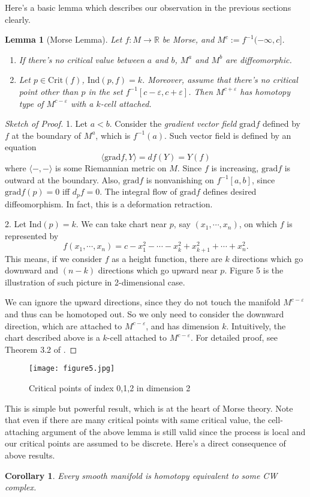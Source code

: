 \documentclass{article}
\newtheorem{lemma}[theorem]{Lemma}
\newtheorem{corollary}[theorem]{Corollary}
\newcommand{\R}{\mathbb{R}}
\newcommand{\ep}{\varepsilon}
\newcommand{\il}{\langle}
\newcommand{\ir}{\rangle}
\newcommand{\Crit}{\mathrm{Crit}}
\newcommand{\grad}{\mathrm{grad}}
\newcommand{\Ind}{\mathrm{Ind}}
\begin{document}
Here's a basic lemma which describes our observation in the previous sections clearly.
	\begin{lemma}[Morse Lemma]\rm
	Let $f:M\to\R$ be Morse, and $M^c:=f^{-1}(-\infty,c]$.
	\begin{enumerate}
	\item If there's no critical value between $a$ and $b$, $M^a$ and $M^b$ are diffeomorphic.
	\item Let $p\in\Crit(f)$, $\Ind(p,f)=k$.
	Moreover, assume that there's no critical point other than $p$ in the set $f^{-1}[c-\ep,c+\ep]$.
	Then $M^{c+\ep}$ has homotopy type of $M^{c-\ep}$ with a $k$-cell attached.
	\end{enumerate}
	\end{lemma}
		\begin{proof}[Sketch of Proof]
		1. Let $a<b$.
		Consider the \emph{gradient vector field} $\grad f$ defined by $f$ at the boundary of $M^a$, which is $f^{-1}(a)$.
		Such vector field is defined by an equation
			$$\il\grad f,Y\ir=df(Y)=Y(f)$$
		where $\il-,-\ir$ is some Riemannian metric on $M$.
		Since $f$ is increasing, $\grad f$ is outward at the boundary.
		Also, $\grad f$ is nonvanishing on $f^{-1}[a,b]$, since $\grad f(p)=0$ iff $d_p f=0$.
		The integral flow of $\grad f$ defines desired diffeomorphism.
		In fact, this is a deformation retraction.
		
		2. Let $\Ind(p)=k$.
		We can take chart near $p$, say $(x_1,\cdots,x_n)$, on which $f$ is represented by
			$$f(x_1,\cdots,x_n)=c-x_1^2-\cdots-x_k^2+x_{k+1}^2+\cdots+x_n^2.$$
		This means, if we consider $f$ as a height function, there are $k$ directions which go downward and $(n-k)$ directions which go upward near $p$.
		Figure 5 is the illustration of such picture in 2-dimensional case.
		
		We can ignore the upward directions, since they do not touch the manifold $M^{c-\ep}$ and thus can be homotoped out.
		So we only need to consider the downward direction, which are attached to $M^{c-\ep}$, and has dimension $k$.
		Intuitively, the chart described above is a $k$-cell attached to $M^{c-\ep}$.
		For detailed proof, see Theorem 3.2 of \cite{m1}.
		\end{proof}

\begin{figure}[h]
		\centering
		\texttt{[image: figure5.jpg]}
		\caption{Critical points of index 0,1,2 in dimension 2}
\end{figure}

This is simple but powerful result, which is at the heart of Morse theory.
Note that even if there are many critical points with same critical value, the cell-attaching argument of the above lemma is still valid since the process is local and our critical points are assumed to be discrete.
Here's a direct consequence of above results.
	\begin{corollary}\rm
	Every smooth manifold is homotopy equivalent to some CW complex.
	\end{corollary}
\end{document}
